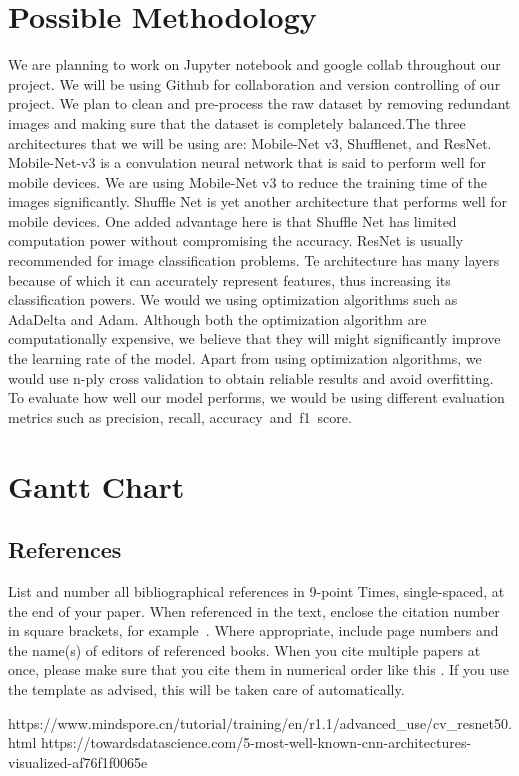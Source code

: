 \documentclass[10pt,twocolumn,letterpaper]{article}
\begin{document}
  \section{Possible Methodology}
We are planning to work on Jupyter notebook and google collab throughout our project. We will be using Github for collaboration and version controlling of our project. We plan to clean and pre-process the raw dataset by removing redundant images and making sure that the dataset is completely balanced.The three architectures that we will be using are: Mobile-Net v3, Shufflenet, and ResNet. Mobile-Net-v3 is a convulation neural network that is said to perform well for mobile devices. We are using Mobile-Net v3 to reduce the training time of the images significantly. Shuffle Net is yet another architecture that performs well for mobile devices. One added advantage here is that Shuffle Net has limited computation power without compromising the accuracy. ResNet is usually recommended for image classification problems. Te architecture has many layers because of which it can accurately represent features, thus increasing its classification powers. We would we using optimization algorithms such as AdaDelta and Adam. Although both the optimization algorithm are computationally expensive, we believe that they will might significantly improve the learning rate of the model. Apart from using optimization algorithms, we would use n-ply cross validation to obtain reliable results and avoid overfitting. To evaluate how well our model performs, we would be using different evaluation metrics such as precision, recall, accuracy and f1 score.

\pagebreak

  \section{Gantt Chart}

  

  \subsection{References}

  List and number all bibliographical references in 9-point Times, single-spaced, at the end of your paper.
  When referenced in the text, enclose the citation number in square brackets, for
  example~\cite{Authors14}.
  Where appropriate, include page numbers and the name(s) of editors of referenced books.
  When you cite multiple papers at once, please make sure that you cite them in numerical order like this \cite{Alpher02,Alpher03,Alpher05,Authors14b,Authors14}.
  If you use the template as advised, this will be taken care of automatically.


  



  {\small
  
  
  }
  https://www.mindspore.cn/tutorial/training/en/r1.1/advanced_use/cv_resnet50.html
  https://towardsdatascience.com/5-most-well-known-cnn-architectures-visualized-af76f1f0065e
  

  
\end{document}
